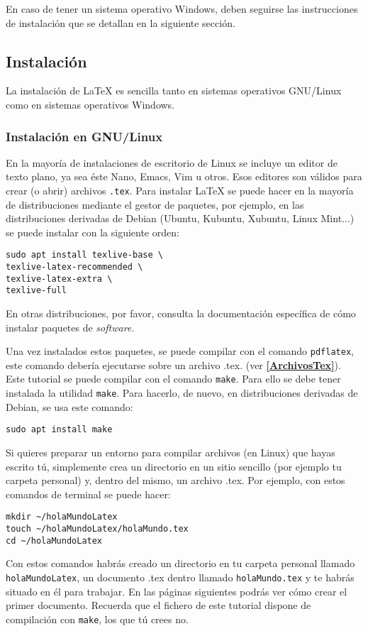 \documentclass[a4paper]{article}
\begin{document}
En caso de tener un sistema operativo Windows, deben seguirse las instrucciones
de instalación que se detallan en la siguiente sección.
\subsection{Instalación}
La instalación de \LaTeX{} es sencilla tanto en sistemas operativos GNU/Linux
como en sistemas operativos Windows.
\subsubsection{Instalación en GNU/Linux}\label{instGNULinux}
En la mayoría de instalaciones de escritorio de Linux se incluye un editor de
texto plano, ya sea éste Nano, Emacs, Vim u otros. Esos editores son válidos
para crear (o abrir) archivos \texttt{.tex}. Para instalar \LaTeX{} se puede
hacer en la mayoría de distribuciones mediante el gestor de paquetes, por
ejemplo, en las distribuciones derivadas de Debian (Ubuntu, Kubuntu, Xubuntu,
Linux Mint...) se puede instalar con la siguiente orden:
\begin{verbatim}
sudo apt install texlive-base \
texlive-latex-recommended \
texlive-latex-extra \
texlive-full
\end{verbatim} 
En otras distribuciones, 
por favor, consulta la documentación específica de cómo instalar paquetes de
\textit{software}.

Una vez instalados estos paquetes, se puede compilar con el comando
\texttt{pdflatex}, este comando debería ejecutarse sobre un archivo .tex.
(ver \textbf{\ref{ArchivosTex}}). Este tutorial se puede compilar
con el comando \texttt{make}. Para ello se debe tener instalada la utilidad 
\texttt{make}. Para hacerlo, de nuevo, en distribuciones derivadas de
Debian, se usa este comando:
\begin{verbatim}
sudo apt install make
\end{verbatim}

Si quieres preparar un entorno para compilar archivos (en Linux) que hayas
escrito tú, simplemente crea un directorio en un sitio sencillo (por ejemplo tu
carpeta personal) y, dentro del mismo, un archivo .tex. Por ejemplo, con estos
comandos de terminal se puede hacer:
\begin{verbatim}
mkdir ~/holaMundoLatex
touch ~/holaMundoLatex/holaMundo.tex
cd ~/holaMundoLatex
\end{verbatim}

Con estos comandos habrás creado un directorio en tu carpeta personal llamado
\texttt{holaMundoLatex}, un documento .tex dentro llamado \texttt{holaMundo.tex}
y te habrás situado en él para trabajar. En las páginas siguientes podrás ver
cómo crear el primer documento. Recuerda que el fichero de este tutorial dispone
de compilación con \texttt{make}, los que tú crees no.
\end{document}
